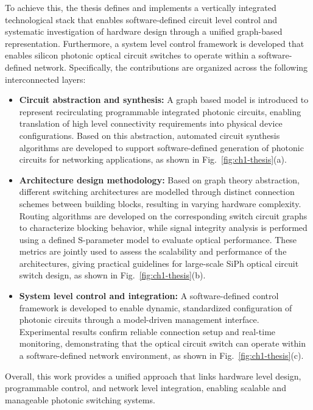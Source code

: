 To achieve this, the thesis defines and implements a vertically integrated technological stack that enables software-defined circuit level control and systematic investigation of hardware design through a unified graph-based representation.
Furthermore, a system level control framework is developed that enables silicon photonic optical circuit switches to operate within a software-defined network.
Specifically, the contributions are organized across the following interconnected layers:
\begin{itemize}
    \item \textbf{Circuit abstraction and synthesis:} A graph based model is introduced to represent recirculating programmable integrated photonic circuits, enabling translation of high level connectivity requirements into physical device configurations.
          Based on this abstraction, automated circuit synthesis algorithms are developed to support software-defined generation of photonic circuits for networking applications, as shown in Fig.~\ref{fig:ch1-thesis}(a).

    \item \textbf{Architecture design methodology:} Based on graph theory abstraction, different switching architectures are modelled through distinct connection schemes between building blocks, resulting in varying hardware complexity.
          Routing algorithms are developed on the corresponding switch circuit graphs to characterize blocking behavior, while signal integrity analysis is performed using a defined S-parameter model to evaluate optical performance.
          These metrics are jointly used to assess the scalability and performance of the architectures, giving practical guidelines for large-scale SiPh optical circuit switch design, as shown in Fig.~\ref{fig:ch1-thesis}(b).

    \item \textbf{System level control and integration:} A software-defined control framework is developed to enable dynamic, standardized configuration of photonic circuits through a model-driven management interface.
          Experimental results confirm reliable connection setup and real-time monitoring, demonstrating that the optical circuit switch can operate within a software-defined network environment, as shown in Fig.~\ref{fig:ch1-thesis}(c).
\end{itemize}
Overall, this work provides a unified approach that links hardware level design, programmable control, and network level integration, enabling scalable and manageable photonic switching systems.

